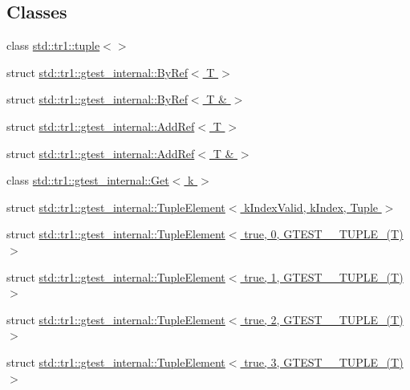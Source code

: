 \subsection*{Classes}
\begin{DoxyCompactItemize}
\item 
class \hyperlink{classstd_1_1tr1_1_1tuple}{std\+::tr1\+::tuple$<$$>$}
\item 
struct \hyperlink{structstd_1_1tr1_1_1gtest__internal_1_1_by_ref}{std\+::tr1\+::gtest\+\_\+internal\+::\+By\+Ref$<$ T $>$}
\item 
struct \hyperlink{structstd_1_1tr1_1_1gtest__internal_1_1_by_ref_3_01_t_01_6_01_4}{std\+::tr1\+::gtest\+\_\+internal\+::\+By\+Ref$<$ T \& $>$}
\item 
struct \hyperlink{structstd_1_1tr1_1_1gtest__internal_1_1_add_ref}{std\+::tr1\+::gtest\+\_\+internal\+::\+Add\+Ref$<$ T $>$}
\item 
struct \hyperlink{structstd_1_1tr1_1_1gtest__internal_1_1_add_ref_3_01_t_01_6_01_4}{std\+::tr1\+::gtest\+\_\+internal\+::\+Add\+Ref$<$ T \& $>$}
\item 
class \hyperlink{classstd_1_1tr1_1_1gtest__internal_1_1_get}{std\+::tr1\+::gtest\+\_\+internal\+::\+Get$<$ k $>$}
\item 
struct \hyperlink{structstd_1_1tr1_1_1gtest__internal_1_1_tuple_element}{std\+::tr1\+::gtest\+\_\+internal\+::\+Tuple\+Element$<$ k\+Index\+Valid, k\+Index, Tuple $>$}
\item 
struct \hyperlink{structstd_1_1tr1_1_1gtest__internal_1_1_tuple_element_3_01true_00_010_00_01_g_t_e_s_t__10___t_u_p_l_e___07_t_08_01_4}{std\+::tr1\+::gtest\+\_\+internal\+::\+Tuple\+Element$<$ true, 0, G\+T\+E\+S\+T\+\_\+\_\+\+T\+U\+P\+L\+E\+\_\+(\+T) $>$}
\item 
struct \hyperlink{structstd_1_1tr1_1_1gtest__internal_1_1_tuple_element_3_01true_00_011_00_01_g_t_e_s_t__10___t_u_p_l_e___07_t_08_01_4}{std\+::tr1\+::gtest\+\_\+internal\+::\+Tuple\+Element$<$ true, 1, G\+T\+E\+S\+T\+\_\+\_\+\+T\+U\+P\+L\+E\+\_\+(\+T) $>$}
\item 
struct \hyperlink{structstd_1_1tr1_1_1gtest__internal_1_1_tuple_element_3_01true_00_012_00_01_g_t_e_s_t__10___t_u_p_l_e___07_t_08_01_4}{std\+::tr1\+::gtest\+\_\+internal\+::\+Tuple\+Element$<$ true, 2, G\+T\+E\+S\+T\+\_\+\_\+\+T\+U\+P\+L\+E\+\_\+(\+T) $>$}
\item 
struct \hyperlink{structstd_1_1tr1_1_1gtest__internal_1_1_tuple_element_3_01true_00_013_00_01_g_t_e_s_t__10___t_u_p_l_e___07_t_08_01_4}{std\+::tr1\+::gtest\+\_\+internal\+::\+Tuple\+Element$<$ true, 3, G\+T\+E\+S\+T\+\_\+\_\+\+T\+U\+P\+L\+E\+\_\+(\+T) $>$}

\end{DoxyCompactItemize}
